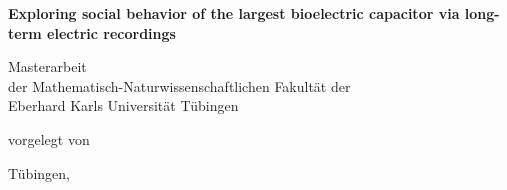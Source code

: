 \begin{titlepage}
    \begin{center}

        \vspace*{2cm}

        \LARGE
        \textbf{Exploring social behavior of the largest bioelectric capacitor via long-term electric recordings}

        \vspace*{1cm}
        \large
        Masterarbeit\\

        \vspace{1cm}
        \large
        der Mathematisch-Naturwissenschaftlichen Fakultät der\\
        Eberhard Karls Universität Tübingen

        \vfill

        \large
        vorgelegt von  
        
        \Large
        \authorname

        \vspace{1.5cm}

        \Large
        Tübingen, \wrdate

        \vspace{0.7cm}
        
        
    \end{center}
\end{titlepage}

\newpage 


